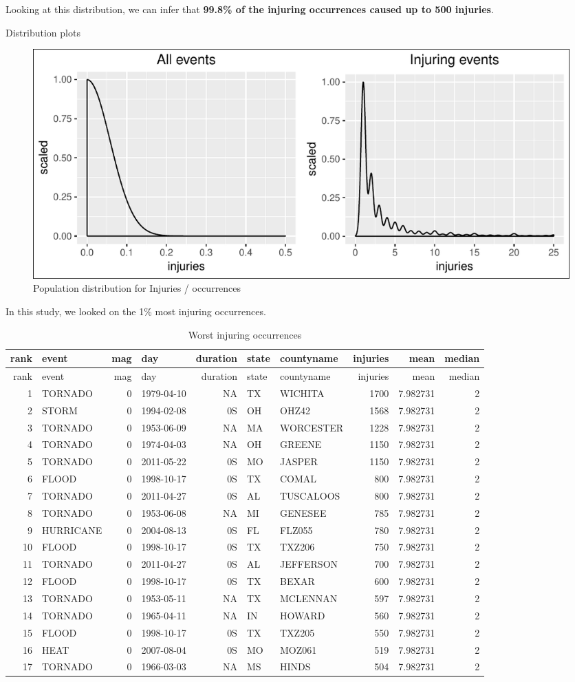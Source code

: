 \documentclass[]{article}
\begin{document}
Looking at this distribution, we can infer that \textbf{99.8\% of the
injuring occurrences caused up to 500 injuries}.

Distribution plots

\begin{figure}[htbp]
\centering
\includegraphics{readme_files/figure-latex/inj-distribution-1.pdf}
\caption{Population distribution for Injuries / occurrences}
\end{figure}

In this study, we looked on the 1\% most injuring occurrences.

\begin{longtable}[]{@{}rlrlrllrrr@{}}
\caption{Worst injuring occurrences}\tabularnewline
\toprule
rank & event & mag & day & duration & state & countyname & injuries &
mean & median\tabularnewline
\midrule
\endfirsthead
\toprule
rank & event & mag & day & duration & state & countyname & injuries &
mean & median\tabularnewline
\midrule
\endhead
1 & TORNADO & 0 & 1979-04-10 & NA & TX & WICHITA & 1700 & 7.982731 &
2\tabularnewline
2 & STORM & 0 & 1994-02-08 & 0S & OH & OHZ42 & 1568 & 7.982731 &
2\tabularnewline
3 & TORNADO & 0 & 1953-06-09 & NA & MA & WORCESTER & 1228 & 7.982731 &
2\tabularnewline
4 & TORNADO & 0 & 1974-04-03 & NA & OH & GREENE & 1150 & 7.982731 &
2\tabularnewline
5 & TORNADO & 0 & 2011-05-22 & 0S & MO & JASPER & 1150 & 7.982731 &
2\tabularnewline
6 & FLOOD & 0 & 1998-10-17 & 0S & TX & COMAL & 800 & 7.982731 &
2\tabularnewline
7 & TORNADO & 0 & 2011-04-27 & 0S & AL & TUSCALOOS & 800 & 7.982731 &
2\tabularnewline
8 & TORNADO & 0 & 1953-06-08 & NA & MI & GENESEE & 785 & 7.982731 &
2\tabularnewline
9 & HURRICANE & 0 & 2004-08-13 & 0S & FL & FLZ055 & 780 & 7.982731 &
2\tabularnewline
10 & FLOOD & 0 & 1998-10-17 & 0S & TX & TXZ206 & 750 & 7.982731 &
2\tabularnewline
11 & TORNADO & 0 & 2011-04-27 & 0S & AL & JEFFERSON & 700 & 7.982731 &
2\tabularnewline
12 & FLOOD & 0 & 1998-10-17 & 0S & TX & BEXAR & 600 & 7.982731 &
2\tabularnewline
13 & TORNADO & 0 & 1953-05-11 & NA & TX & MCLENNAN & 597 & 7.982731 &
2\tabularnewline
14 & TORNADO & 0 & 1965-04-11 & NA & IN & HOWARD & 560 & 7.982731 &
2\tabularnewline
15 & FLOOD & 0 & 1998-10-17 & 0S & TX & TXZ205 & 550 & 7.982731 &
2\tabularnewline
16 & HEAT & 0 & 2007-08-04 & 0S & MO & MOZ061 & 519 & 7.982731 &
2\tabularnewline
17 & TORNADO & 0 & 1966-03-03 & NA & MS & HINDS & 504 & 7.982731 &
2\tabularnewline
\bottomrule
\end{longtable}
\end{document}
